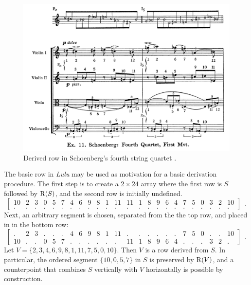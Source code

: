 \begin{figure}[htbp]
    \centering
	\includegraphics[width=6.5in]{figures/schoenberg4.png}
	\caption[Derived Row in Schoenberg's fourth string quartet]{Derived row in Schoenberg's fourth string quartet \cite[100]{Westergaard1966}.}
	\label{fig:schoenberg-quartet}
\end{figure}


\begin{example}
	\label{ex:derivation}
	The basic row in \emph{Lulu} may be used as motivation for a basic derivation procedure. The first step is to create a $2 \times 24$ array where the first row is $S$ followed by $\operatorname{R}(S)$, and the second row is initially undefined.
	\begin{equation}
    	\left[
    	\begin{array}{cccccccccccc|cccccccccccc}
        	10 & 2 & 3 & 0 & 5 & 7 & 4 & 6 & 9 & 8 & 1 & 11 & 11 & 1 & 8 & 9 & 6 & 4 & 7 & 5 & 0 & 3 & 2 & 10 \\
        	. & . & . & . & . & . & . & . & . & . & . & . & . & . & . & . & . & . & . & . & . & . & . & .
    	\end{array}
    	\right] \enspace.
	\end{equation}
	Next, an arbitrary segment is chosen, separated from the the top row, and placed in in the bottom row:
	\begin{equation}
    	\left[
    	\begin{array}{cccccccccccc|cccccccccccc}
        	. & 2 & 3 & . & . & . & 4 & 6 & 9 & 8 & 1 & 11 & . & . & . & . & . & . & 7 & 5 & 0 & . & . & 10 \\
        	10 & . & . & 0 & 5 & 7 & . & . & . & . & . & . & 11 & 1 & 8 & 9 & 6 & 4 & . & . & . & 3 & 2 & .
    	\end{array}
    	\right] \enspace.
	\end{equation}
	Let $V = \{ 2, 3, 4, 6, 9, 8, 1, 11, 7, 5, 0, 10 \}$. Then $V$ is a row derived from $S$. In particular, the ordered segment $\{ 10, 0, 5, 7 \}$ in $S$ is preserved by $\operatorname{R}(V)$, and a counterpoint that combines $S$ vertically with $V$ horizontally is possible by construction.
\end{example}


